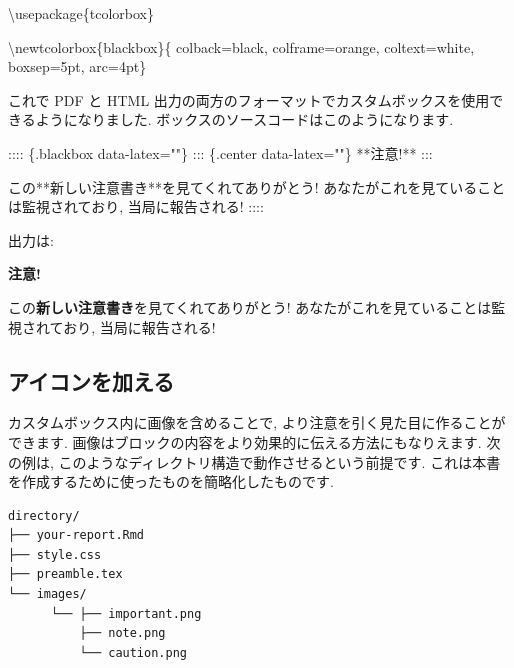 \documentclass[
  11pt,
]{bxjsreport}
\newenvironment{Shaded}{\begin{snugshade}}{\end{snugshade}}
\newcommand{\BuiltInTok}[1]{#1}
\newcommand{\ExtensionTok}[1]{#1}
\newcommand{\FunctionTok}[1]{\textcolor[rgb]{0.00,0.00,0.00}{#1}}
\newcommand{\NormalTok}[1]{#1}
\newenvironment{blackbox}{
  \definecolor{shadecolor}{rgb}{0, 0, 0}  %
  \color{white}
  \begin{shaded}}
 {\end{shaded}}
\begin{document}
\begin{Shaded}
\begin{Highlighting}[]
\BuiltInTok{\textbackslash{}usepackage}\NormalTok{\{}\ExtensionTok{tcolorbox}\NormalTok{\}}

\FunctionTok{\textbackslash{}newtcolorbox}\NormalTok{\{blackbox\}\{}
\NormalTok{  colback=black,}
\NormalTok{  colframe=orange,}
\NormalTok{  coltext=white,}
\NormalTok{  boxsep=5pt,}
\NormalTok{  arc=4pt\}}
\end{Highlighting}
\end{Shaded}

これで PDF と HTML 出力の両方のフォーマットでカスタムボックスを使用できるようになりました. ボックスのソースコードはこのようになります.

\begin{Shaded}
\begin{Highlighting}[]
\NormalTok{:::: \{.blackbox data{-}latex=""\}}
\NormalTok{::: \{.center data{-}latex=""\}}
\NormalTok{**注意!**}
\NormalTok{:::}

\NormalTok{この**新しい注意書き**を見てくれてありがとう! あなたがこれを見ていることは監視されており, 当局に報告される!}
\NormalTok{::::}
\end{Highlighting}
\end{Shaded}

出力は:

\begin{blackbox}

\begin{center}
\textbf{注意!}

\end{center}

この\textbf{新しい注意書き}を見てくれてありがとう! あなたがこれを見ていることは監視されており, 当局に報告される!

\end{blackbox}

\hypertarget{block-image}{%
\subsection{アイコンを加える}\label{block-image}}

カスタムボックス内に画像を含めることで, より注意を引く見た目に作ることができます. 画像はブロックの内容をより効果的に伝える方法にもなりえます. 次の例は, このようなディレクトリ構造で動作させるという前提です. これは本書を作成するために使ったものを簡略化したものです.

\begin{verbatim}
directory/
├── your-report.Rmd
├── style.css
├── preamble.tex
└── images/ 
      └── ├── important.png
          ├── note.png
          └── caution.png
\end{verbatim}
\end{document}
